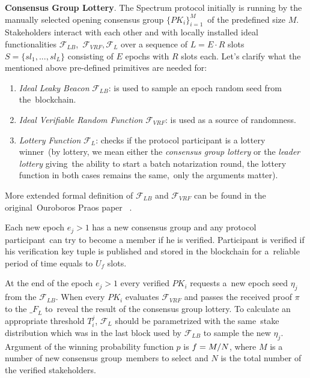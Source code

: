 \textbf{Consensus Group Lottery}.
The Spectrum protocol initially is running by the manually selected opening consensus group $\{PK_i\}_{i=1}^M$\
of the predefined size $M$.
Stakeholders interact with each other and with locally installed ideal functionalities ${\mathcal{F}}_{LB}$,\
${\mathcal{F}}_{VRF}, {\mathcal{F}}_{L}$ over a sequence of $L = E \cdot R$ slots\
${S=\{sl_1,...,sl_L\}}$ consisting of $E$ epochs with $R$ slots each.
Let's clarify what the mentioned above pre-defined primitives are needed for:
\begin{enumerate}
    \item \emph{Ideal Leaky Beacon} ${\mathcal{F}}_{LB}$: is used to sample an epoch random seed from the\
    blockchain.
    \item \emph{Ideal Verifiable Random Function} ${\mathcal{F}}_{VRF}$: is used as a source of randomness.
    \item \emph{Lottery Function} ${\mathcal{F}}_{L}$: checks if the protocol participant is a lottery winner\
    (by lottery, we mean either the \emph{consensus group lottery} or the \emph{leader lottery} giving\
    the ability to start a batch notarization round, the lottery function in both cases remains the same,\
    only the arguments matter).
\end{enumerate}
More extended formal definition of ${\mathcal{F}}_{LB}$ and ${\mathcal{F}}_{VRF}$ can be found in the original\
Ouroboros Praos paper ~\cite{cryptoeprint:2017/573}.

Each new epoch ${e_j \gt 1}$ has a new consensus group and any protocol participant\
can try to become a member if he is verified.
Participant is verified if his verification key tuple is published and stored in the blockchain for a\
reliable period of time equals to $U_f$ slots.

At the end of the epoch ${e_j \gt 1}$ every verified $PK_i$ requests a\
new epoch seed $\eta_j$ from the ${\mathcal{F}}_{LB}$.
When every $PK_i$ evaluates ${\mathcal{F}}_{VRF}$ and passes the received proof $\pi$ to the ${\mathcal_{F}}_{L}$ to\
reveal the result of the consensus group lottery.
To calculate an appropriate threshold ${T_i^j}$, ${\mathcal{F}}_{L}$ should be parametrized with the same\
stake distribution which was in the last block used by ${\mathcal{F}}_{LB}$ to sample the new $\eta_j$.
Argument of the winning probability function $p$ is ${f = M /\/ N}$, where $M$ is a number of new consensus group\
members to select and $N$ is the total number of the verified stakeholders.

